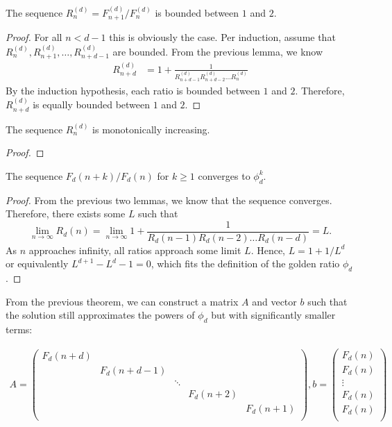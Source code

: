 \documentclass[english,version-2020-11]{uzl-thesis}
\begin{document}
\begin{lemma}
  The sequence $R^{(d)}_n = F^{(d)}_{n+1} / F^{(d)}_{n}$ is bounded between $1$ and $2$.
\end{lemma}

\begin{proof}
  For all $n < d - 1$ this is obviously the case.
  Per induction, assume that $R^{(d)}_n, R^{(d)}_{n+1}, \dots, R^{(d)}_{n+d-1}$ are bounded.
  From the previous lemma, we know
  \begin{align*}
    R^{(d)}_{n+d}
    & = 1 + \frac{1}{R^{(d)}_{n+d-1} R^{(d)}_{n+d-2} \dots R^{(d)}_n}
  \end{align*}
  By the induction hypothesis, each ratio is bounded between $1$ and $2$.
  Therefore, $R^{(d)}_{n+d}$ is equally bounded between $1$ and $2$.
\end{proof}

\begin{lemma}
  The sequence $R^{(d)}_n$ is monotonically increasing.
\end{lemma}

\begin{proof}

\end{proof}

\begin{theorem}
  The sequence $F_d(n + k) / F_d(n)$ for $k \ge 1$ converges to $\phi_d^k$.
\end{theorem}

\begin{proof}
  From the previous two lemmas, we know that the sequence converges.
  Therefore, there exists some $L$ such that
  \[
    \lim_{n \to \infty} R_d(n) = \lim_{n \to \infty} 1 + \frac{1}{R_d(n-1) R_d(n-2) \dots R_d(n-d)} = L.
  \]
  As $n$ approaches infinity, all ratios approach some limit $L$.
  Hence, $L = 1 + 1/L^d$ or equivalently $L^{d+1} - L^d - 1 = 0$,
  which fits the definition of the golden ratio $\phi_d$.
\end{proof}

From the previous theorem, we can construct a matrix $A$ and vector $b$ such that the solution
still approximates the powers of $\phi_d$ but with significantly smaller terms:

\begin{align*}
  A = \begin{pmatrix}
    F_d(n + d) \\
    & F_d(n + d - 1) \\
    && \ddots \\
    &&& F_d(n + 2) \\
    &&&& F_d(n + 1) \\
  \end{pmatrix},
  b =
  \begin{pmatrix}
    F_d(n) \\
    F_d(n) \\
    \vdots \\
    F_d(n) \\
    F_d(n) \\
  \end{pmatrix}
\end{align*}
\end{document}
